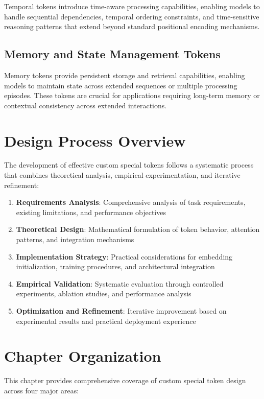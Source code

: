 Temporal tokens introduce time-aware processing capabilities, enabling models to handle sequential dependencies, temporal ordering constraints, and time-sensitive reasoning patterns that extend beyond standard positional encoding mechanisms.

\subsection{Memory and State Management Tokens}

Memory tokens provide persistent storage and retrieval capabilities, enabling models to maintain state across extended sequences or multiple processing episodes. These tokens are crucial for applications requiring long-term memory or contextual consistency across extended interactions.

\section{Design Process Overview}

The development of effective custom special tokens follows a systematic process that combines theoretical analysis, empirical experimentation, and iterative refinement:

\begin{enumerate}
\item \textbf{Requirements Analysis}: Comprehensive analysis of task requirements, existing limitations, and performance objectives
\item \textbf{Theoretical Design}: Mathematical formulation of token behavior, attention patterns, and integration mechanisms
\item \textbf{Implementation Strategy}: Practical considerations for embedding initialization, training procedures, and architectural integration
\item \textbf{Empirical Validation}: Systematic evaluation through controlled experiments, ablation studies, and performance analysis
\item \textbf{Optimization and Refinement}: Iterative improvement based on experimental results and practical deployment experience
\end{enumerate}

\section{Chapter Organization}

This chapter provides comprehensive coverage of custom special token design across four major areas:

